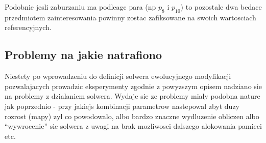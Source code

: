 \documentclass[]{article}
\begin{document}
Podobnie jesli zaburzaniu ma podleagc para (np \({p_8}\) i \(p_{10}\))
to pozostale dwa bedace przedmiotem zainteresowania powinny zostac
zafiksowane na swoich wartosciach referencyjnych.

\subsection{Problemy na jakie
natrafiono}\label{problemy-na-jakie-natrafiono}

Niestety po wprowadzeniu do definicji solwera ewolucyjnego modyfikacji
pozwalajacych prowadzic eksperymenty zgodnie z powyzszym opisem nadziano
sie na problemy z dzialaniem solwera. Wydaje sie ze problemy mialy
podobna nature jak poprzednio - przy jakiejs kombinacji parametrow
nastepowal zbyt duzy rozrost (mapy) zyl co powodowalo, albo bardzo
znaczne wydluzenie obliczen albo ``wywrocenie'' sie solwera z uwagi na
brak mozliwosci dalszego alokowania pamieci etc.
\end{document}
